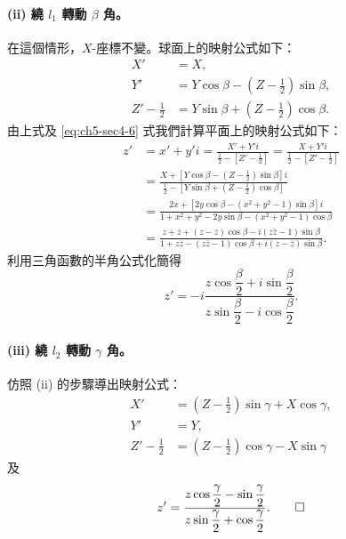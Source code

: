 \paragraph{(ii) 繞 $l_1$ 轉動 $\beta$ 角。}
在這個情形，$X$-座標不變。球面上的映射公式如下：
\begin{align*}
X' &= X, \\
Y' &= Y\cos\beta - \left(Z-\frac{1}{2}\right)\sin\beta, \\
Z'-\frac{1}{2} &= Y\sin\beta + \left(Z-\frac{1}{2}\right)\cos\beta.
\end{align*}
由上式及 \eqref{eq:ch5-sec4-6} 式我們計算平面上的映射公式如下：
\begin{align*}
z' &= x'+y'i = \frac{X'+Y'i}{\frac{1}{2}-\left[Z'-\frac{1}{2}\right]} = \frac{X+Y'i}{\frac{1}{2}-\left[Z'-\frac{1}{2}\right]} \\
&= \frac{X+\left[Y\cos\beta-\left(Z-\frac{1}{2}\right)\sin\beta\right]i}{\frac{1}{2}-\left[Y\sin\beta+\left(Z-\frac{1}{2}\right)\cos\beta\right]} \\
&= \frac{2x+[2y\cos\beta-(x^2+y^2-1)\sin\beta]i}{1+x^2+y^2-2y\sin\beta-(x^2+y^2-1)\cos\beta} \\
&= \frac{z+\bar{z}+(z-\bar{z})\cos\beta-i(z\bar{z}-1)\sin\beta}{1+z\bar{z}-(z\bar{z}-1)\cos\beta+i(z-\bar{z})\sin\beta}.
\end{align*}
利用三角函數的半角公式化簡得
\[
z' = -i\frac{z\cos\dfrac{\beta}{2}+i\sin\dfrac{\beta}{2}}{z\sin\dfrac{\beta}{2}-i\cos\dfrac{\beta}{2}}.
\]

\paragraph{(iii) 繞 $l_2$ 轉動 $\gamma$ 角。}
仿照 (ii) 的步驟導出映射公式：
\begin{align*}
X' &= \left(Z-\frac{1}{2}\right)\sin\gamma + X\cos\gamma, \\
Y' &= Y, \\
Z'-\frac{1}{2} &= \left(Z-\frac{1}{2}\right)\cos\gamma - X\sin\gamma
\end{align*}
及
\[
z' = \frac{z\cos\dfrac{\gamma}{2}-\sin\dfrac{\gamma}{2}}{z\sin\dfrac{\gamma}{2}+\cos\dfrac{\gamma}{2}}. \qedhere
\]

